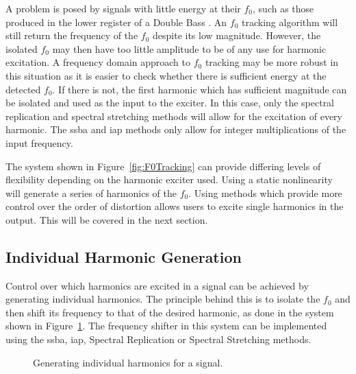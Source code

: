 		A problem is posed by signals with little energy at their $f_{0}$, such as those produced in the lower
		register of a Double Bass \citep{askenfelt2010double}. An $f_{0}$ tracking algorithm will still return the
		frequency of the $f_{0}$ despite its low magnitude. However, the isolated $f_{0}$ may then have too little
		amplitude to be of any use for harmonic excitation. A frequency domain approach to $f_{0}$ tracking may be
		more robust in this situation as it is easier to check whether there is sufficient energy at the detected
		$f_{0}$. If there is not, the first harmonic which has sufficient magnitude can be isolated and used as the
		input to the exciter. In this case, only the spectral replication and spectral stretching methods will
		allow for the excitation of every harmonic. The \acrshort{ssba} and \acrshort{iap} methods only allow for
		integer multiplications of the input frequency.

		The system shown in Figure~\ref{fig:F0Tracking} can provide differing levels of flexibility depending on
		the harmonic exciter used. Using a static nonlinearity will generate a series of harmonics of the $f_{0}$.
		Using methods which provide more control over the order of distortion allows users to excite single
		harmonics in the output. This will be covered in the next section.

	\subsection{Individual Harmonic Generation}
	\label{sec:FeatureControl-Systems-Individuals}
		Control over which harmonics are excited in a signal can be achieved by generating individual harmonics.
		The principle behind this is to isolate the $f_{0}$ and then shift its frequency to that of the desired
		harmonic, as done in the system shown in Figure~\ref{fig:HarmonicGenerationSystem}.  The frequency shifter
		in this system can be implemented using the \acrshort{ssba}, \acrshort{iap}, Spectral Replication or
		Spectral Stretching methods.

		\begin{figure}[h!]
			\centering
			\caption{Generating individual harmonics for a signal.}
			\label{fig:HarmonicGenerationSystem}
		\end{figure}

